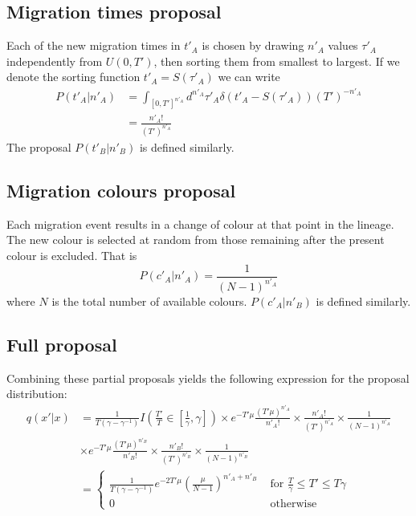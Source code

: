 \documentclass[a4paper, 11pt]{article}
\begin{document}
\subsection{Migration times proposal}

Each of the new migration times in $t'_A$ is chosen by drawing $n'_A$
values $\tau'_A$ independently from $U(0,T')$, then sorting them from smallest
to largest.  If we denote the sorting function $t'_A=S(\tau'_A)$ we
can write
\begin{align}
  P(t'_A|n'_A) &= \int_{[0,T']^{n'_A}}
  d^{n'_A}\tau'_A\delta(t'_A-S(\tau'_A))(T')^{-n'_A}\nonumber\\
&= \frac{n'_A!}{(T')^{n'_A}}
\end{align}
The proposal $P(t'_B|n'_B)$ is defined similarly.

\subsection{Migration colours proposal}

Each migration event results in a change of colour at that point in
the lineage. The new colour is selected at random from those remaining
after the present colour is excluded. That is
\begin{equation}
  P(c'_A|n'_A) = \frac{1}{(N-1)^{n'_A}}
\end{equation}
where $N$ is the total number of available colours. $P(c'_A|n'_B)$ is
defined similarly.

\subsection{Full proposal}

Combining these partial proposals yields the following expression for
the proposal distribution:
\begin{align}
  q(x'|x)&=
  \frac{1}{T(\gamma-\gamma^{-1})}I(\frac{T'}{T}\in[\frac{1}{\gamma},\gamma])\times
  e^{-T'\mu}\frac{(T'\mu)^{n'_A}}{n'_A!}\times
  \frac{n'_A!}{(T')^{n'_A}}\times \frac{1}{(N-1)^{n'_A}}\nonumber\\
&\times e^{-T'\mu}\frac{(T'\mu)^{n'_B}}{n'_B!}\times
  \frac{n'_B!}{(T')^{n'_B}}\times \frac{1}{(N-1)^{n'_B}}\nonumber\\
&=\left\{\begin{array}{rl}
\frac{1}{T(\gamma-\gamma^{-1})}e^{-2T'\mu}\left(\frac{\mu}{N-1}\right)^{n'_A+n'_B} & \text{ for }
\frac{T}{\gamma}\leq T' \leq T\gamma\\
0 & \text{ otherwise}
\end{array}\right.
\end{align}
\end{document}
